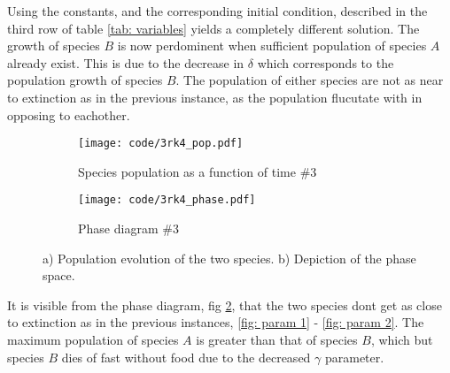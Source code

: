 \documentclass[a4paper]{article}
\newcommand{\newparagraph}{\vspace{.5cm}\noindent}
\begin{document}
\newparagraph
Using the constants, and the corresponding initial condition, described in the third row of table \ref{tab: variables} yields a completely different solution. The growth of species $B$ is now perdominent when sufficient population of species $A$ already exist. This is due to the decrease in $\delta$ which corresponds to the population growth of species $B$. The population of either species are not as near to extinction as in the previous instance, as the population flucutate with in opposing to eachother.
\begin{figure}[H]
    \centering
    \begin{subfigure}{0.45\textwidth}
        \texttt{[image: code/3rk4\_pop.pdf]}
        \caption{Species population as a function of time $\#3$}
        \label{fig: param 3 pop}
    \end{subfigure}
    \hfill    
    \begin{subfigure}{0.45\textwidth}
        \texttt{[image: code/3rk4\_phase.pdf]}
        \caption{Phase diagram $\#3$}
        \label{fig: param 3 phase}
    \end{subfigure}
    \caption{a) Population evolution of the two species. b) Depiction of the phase space.}
    \label{fig: param 3}
\end{figure}\noindent
It is visible from the phase diagram, fig \ref{fig: param 3 phase}, that the two species dont get as close to extinction as in the previous instances, \ref{fig: param 1} - \ref{fig: param 2}. The maximum population of species $A$ is greater than that of species $B$, which but species $B$ dies of fast without food due to the decreased $\gamma$ parameter. 
\end{document}
